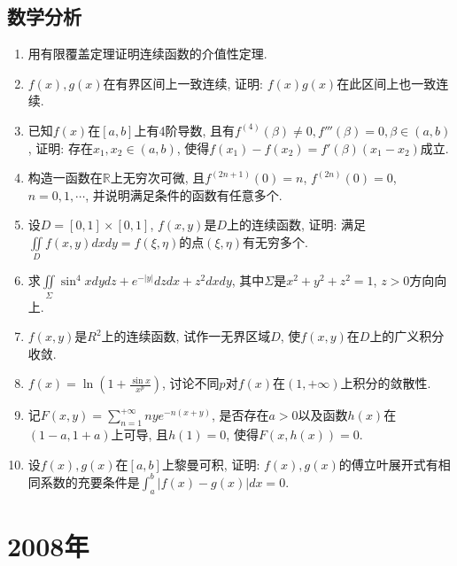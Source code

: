 \documentclass[12pt,a4paper,openany]{book}
\begin{document}
\subsection{数学分析}
\begin{enumerate}
\item 用有限覆盖定理证明连续函数的介值性定理.

\item $f(x), g(x)$在有界区间上一致连续, 证明: $f(x)g(x)$在此区间上也一致连续.

\item 已知$f(x)$在$[a, b]$上有4阶导数, 且有$f^{(4)}(\beta) \neq 0, f'''(\beta) = 0, \beta \in (a, b)$, 证明: 存在$x_1, x_2 \in (a, b)$, 使得$f(x_1) - f(x_2) = f'(\beta)(x_1 - x_2)$成立.

\item 构造一函数在$\mathbb{R}$上无穷次可微, 且$f^{(2n+1)}(0) = n$, $f^{(2n)}(0) = 0$, $n = 0, 1, \cdots$, 并说明满足条件的函数有任意多个.

\item 设$D = [0, 1] \times [0, 1]$, $f(x, y)$是$D$上的连续函数, 证明: 满足$\displaystyle\iint\limits_{D}{f(x, y)dxdy = f(\xi, \eta)}$的点$(\xi, \eta)$有无穷多个.

\item 求$\displaystyle\iint\limits_{\Sigma}{\sin^4{x}dydz + e^{-|y|}dzdx + z^2dxdy}$, 其中$\Sigma$是$x^2 + y^2 + z^2 = 1$, $z > 0$方向向上.

\item $f(x, y)$是$R^2$上的连续函数, 试作一无界区域$D$, 使$f(x, y)$在$D$上的广义积分收敛.

\item $f(x) = \displaystyle\ln{(1 + \frac{\sin{x}}{x^p})}$, 讨论不同$p$对$f(x)$在$(1, +\infty)$上积分的敛散性.

\item 记$F(x, y) = \sum\limits_{n=1}^{+\infty}{nye^{-n(x+y)}}$, 是否存在$a > 0$以及函数$h(x)$在$(1-a, 1+a)$上可导, 且$h(1) = 0$, 使得$F(x, h(x)) = 0$.

\item 设$f(x), g(x)$在$[a, b]$上黎曼可积, 证明: $f(x), g(x)$的傅立叶展开式有相同系数的充要条件是$\displaystyle\int_{a}^{b}{|f(x) - g(x)|dx} = 0$.
\end{enumerate}

\section{2008年}
\end{document}
